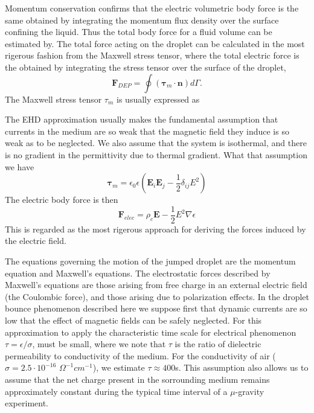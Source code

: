 \documentclass{jfm}
\begin{document}
Momentum conservation confirms that the electric volumetric body force is the same obtained by integrating the momentum flux density over the surface confining the liquid. Thus the total body force for a fluid volume can be estimated by. The total force acting on the droplet can be calculated in the most rigerous fashion from the Maxwell stress tensor, where the total electric force is the obtained by integrating the stress tensor over the surface of the droplet,
\[ \mathbf{F}_{DEP} = \oint (\mathbf{\tau}_m  \cdot \mathbf{n})d\Gamma. \]
The Maxwell stress tensor $\tau_m$ is usually expressed as 

The EHD approximation usually makes the fundamental assumption that currents in the medium are so weak that the magnetic field they induce is so weak as to be neglected. We also assume that the system is isothermal, and there is no gradient in the permittivity due to thermal gradient. What that assumption we have
\[ \mathbf{\tau}_m = \epsilon_0 \epsilon \left(\mathbf{E}_i \mathbf{E}_j - \frac{1}{2} \delta_{ij}E^2 \right) \]
The electric body force is then 
\[ \mathbf{F}_{elec} = \rho_c \mathbf{E} - \frac{1}{2}E^2 \nabla \epsilon \]
This is regarded as the most rigerous approach for deriving the forces induced by the electric field. 

The equations governing the motion of the jumped droplet are the momentum equation and Maxwell's equations. The electrostatic forces described by Maxwell's equations are those arising from free charge in an external electric field (the Coulombic force), and those arising due to polarization effects. In the droplet bounce phenomenon described here we suppose first that dynamic currents are so low that the effect of magnetic fields can be safely neglected. For this approximation to apply the characteristic time scale for electrical phenomenon $\tau = \epsilon/\sigma$, must be small, where we note that $\tau$ is the ratio of dielectric permeability to conductivity of the medium. For the conductivity of air ($\sigma = 2.5 \cdot 10^{-16}$ $\Omega^{-1} cm^{-1}$), we estimate $\tau \approx 400$s. This assumption also allows us to assume that the net charge present in the sorrounding medium remains approximately constant during the typical time interval of a $\mu$-gravity experiment.  
\end{document}
